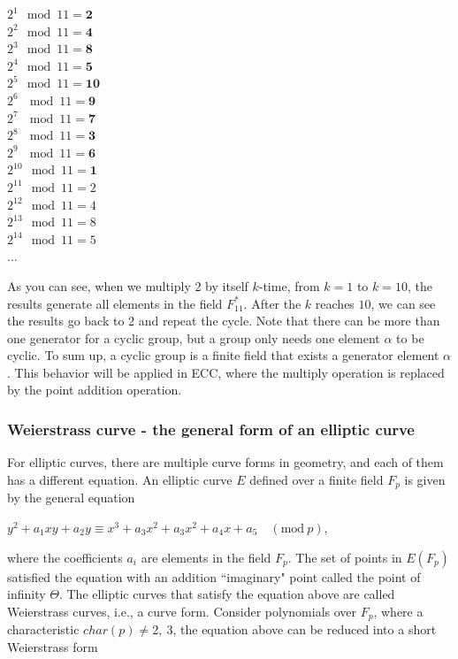 \setlength{\columnsep}{3cm}
\begin{multicols}{3}
  $2^1 \mod 11 = \mathbf{2}$\\
  $2^2 \mod 11 = \mathbf{4}$\\
  $2^3 \mod 11 = \mathbf{8}$\\
  $2^4 \mod 11 = \mathbf{5}$\\
  $2^5 \mod 11 = \mathbf{10}$\\
  $2^6 \ \mod 11 = \mathbf{9}$\\
  $2^7 \ \mod 11 = \mathbf{7}$\\
  $2^8 \ \mod 11 = \mathbf{3}$\\
  $2^9 \ \mod 11 = \mathbf{6}$\\
  $2^{10} \mod 11 = \mathbf{1}$\\
  $2^{11} \mod 11 = 2$\\
  $2^{12} \mod 11 = 4$\\
  $2^{13} \mod 11 = 8$\\
  $2^{14} \mod 11 = 5$\\
  $\dotso$
\end{multicols}


As you can see, when we multiply 2 by itself $k$-time, from $k = 1$ to $k = 10$, the results generate all elements in the field $F_{11}^*$. After the $k$ reaches $10$, we can see the results go back to 2 and repeat the cycle. Note that there can be more than one generator for a cyclic group, but a group only needs one element $\alpha$ to be cyclic. To sum up, a cyclic group is a finite field that exists a generator element $\alpha$. This behavior will be applied in ECC, where the multiply operation is replaced by the point addition operation.

\subsubsection{Weierstrass curve - the general form of an elliptic curve}
For elliptic curves, there are multiple curve forms in geometry, and each of them has a different equation. An elliptic curve $E$ defined over a finite field $F_p$ is given by the general equation

\begin{center}
  $y^2 + a_1xy + a_2y \equiv x^3 + a_3x^2 + a_3x^2 + a_4x + a_5 \quad (\text{mod} \ p)$,\\
\end{center}

where the coefficients $a_i$ are elements in the field $F_p$. The set of points in $E(F_p)$ satisfied the equation with an addition ``imaginary" point called the point of infinity $\Theta$. The elliptic curves that satisfy the equation above are called Weierstrass curves, i.e., a curve form. Consider polynomials over $F_p$, where a characteristic $char(p) \neq 2, \ 3$, the equation above can be reduced into a short Weierstrass form


